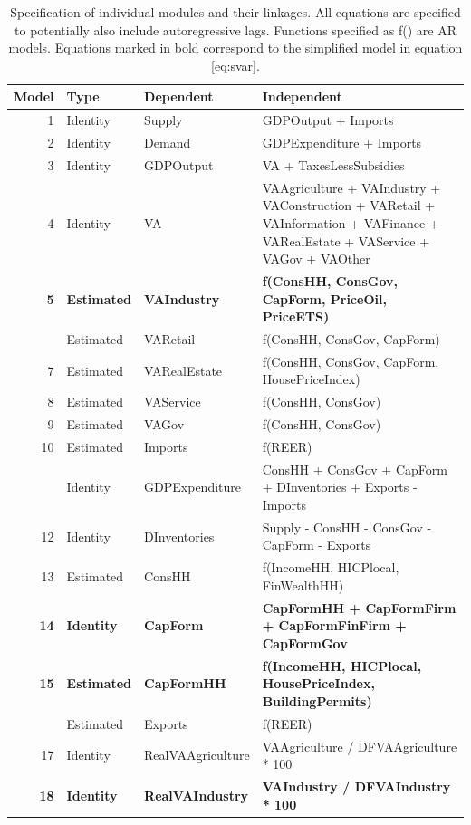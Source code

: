 \begin{table}
\centering
\caption{\label{tab:spec_full}Specification of individual modules and their linkages. All equations are specified to potentially also include autoregressive lags. Functions specified as f() are AR models. Equations marked in bold correspond to the simplified model in equation \ref{eq:svar}.}
\centering
\fontsize{7}{9}\selectfont
\begin{tabular}[t]{rll>{\raggedright\arraybackslash}p{10cm}}
\toprule
Model & Type & Dependent & Independent\\
\midrule
1 & Identity & Supply & GDPOutput + Imports\\
2 & Identity & Demand & GDPExpenditure + Imports\\
3 & Identity & GDPOutput & VA + TaxesLessSubsidies\\
4 & Identity & VA & VAAgriculture + VAIndustry + VAConstruction + VARetail + VAInformation + VAFinance + VARealEstate + VAService + VAGov + VAOther\\
\textbf{5} & \textbf{Estimated} & \textbf{VAIndustry} & \textbf{f(ConsHH, ConsGov, CapForm, PriceOil, PriceETS)}\\
\addlinespace
6 & Estimated & VARetail & f(ConsHH, ConsGov, CapForm)\\
7 & Estimated & VARealEstate & f(ConsHH, ConsGov, CapForm, HousePriceIndex)\\
8 & Estimated & VAService & f(ConsHH, ConsGov)\\
9 & Estimated & VAGov & f(ConsHH, ConsGov)\\
10 & Estimated & Imports & f(REER)\\
\addlinespace
11 & Identity & GDPExpenditure & ConsHH + ConsGov + CapForm + DInventories + Exports - Imports\\
12 & Identity & DInventories & Supply - ConsHH - ConsGov - CapForm - Exports\\
13 & Estimated & ConsHH & f(IncomeHH, HICPlocal, FinWealthHH)\\
\textbf{14} & \textbf{Identity} & \textbf{CapForm} & \textbf{CapFormHH + CapFormFirm + CapFormFinFirm + CapFormGov}\\
\textbf{15} & \textbf{Estimated} & \textbf{CapFormHH} & \textbf{f(IncomeHH, HICPlocal, HousePriceIndex, BuildingPermits)}\\
\addlinespace
16 & Estimated & Exports & f(REER)\\
17 & Identity & RealVAAgriculture & VAAgriculture / DFVAAgriculture * 100\\
\textbf{18} & \textbf{Identity} & \textbf{RealVAIndustry} & \textbf{VAIndustry / DFVAIndustry * 100}\\

\end{tabular}
\end{table}
